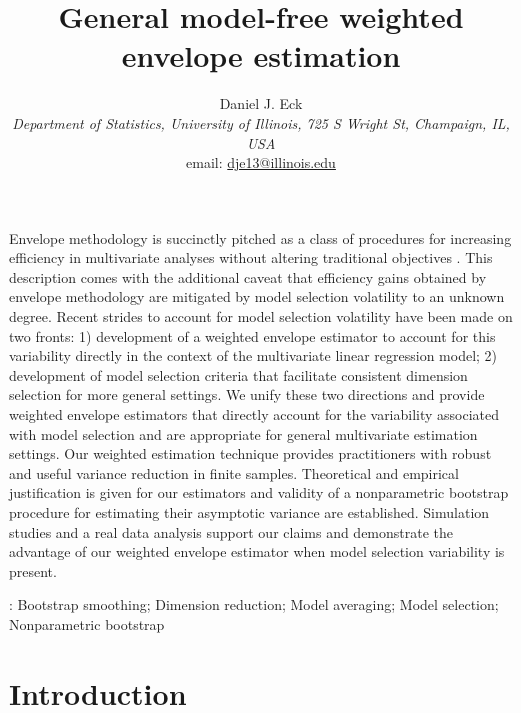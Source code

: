 \documentclass{article}\usepackage[]{graphicx}\usepackage[]{color}
\title{General model-free weighted envelope estimation}
\author{Daniel J. Eck \\[.5em]
\small \emph{Department of Statistics, University of Illinois, 725 S Wright St, Champaign, IL, USA}  \\[.05em]
\footnotesize email: \url{dje13@illinois.edu}}
\date{}
\begin{document}
\maketitle


Envelope methodology is succinctly pitched as a class of procedures for increasing efficiency in multivariate analyses without altering traditional objectives \citep[first sentence of page 1]{cook2018introduction}. This description comes with the additional caveat that efficiency gains obtained by envelope methodology are mitigated by model selection volatility to an unknown degree. Recent strides to account for model selection volatility have been made on two fronts: 1) development of a weighted envelope estimator to account for this variability directly in the context of the multivariate linear regression model; 2) development of model selection criteria that facilitate consistent dimension selection for more general settings. We unify these two directions and provide weighted envelope estimators that directly account for the variability associated with model selection and are appropriate for general multivariate estimation settings. Our weighted estimation technique provides practitioners with robust and useful variance reduction in finite samples. Theoretical and empirical justification is given for our estimators and validity of a nonparametric bootstrap procedure for estimating their asymptotic variance are established. Simulation studies and a real data analysis support our claims and demonstrate the advantage of our weighted envelope estimator when model selection variability is present.


\vspace{9pt}
:
Bootstrap smoothing; Dimension reduction; Model averaging; Model selection; Nonparametric bootstrap
\par



\section{Introduction}
\end{document}
